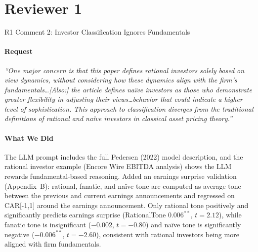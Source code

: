 \documentclass[11pt]{article}
\makeatletter
\def\section{\@ifstar\section@star\section@nostar}
\def\section@star#1{%
  \par\vspace{1.5ex}%
  \noindent{\normalsize\bfseries#1}\par%
  \vspace{0.5ex}%
  \@afterheading%
}
\def\section@nostar#1{%
  \par\vspace{1.5ex}%
  \noindent{%
    \setlength{\fboxsep}{4pt}%
    \colorbox{sectionbg}{\parbox{\dimexpr\textwidth-8pt\relax}{\normalsize\bfseries\strut#1\strut}}%
  }\par%
  \vspace{0.5ex}%
  \@afterheading%
}
\makeatother
\begin{document}
\newpage
\part{Reviewer 1}

\section{R1 Comment 2: Investor Classification Ignores Fundamentals}

\subsection*{Request}
\begin{mdframed}
\textit{``One major concern is that this paper defines rational investors
solely based on view dynamics, without considering how these dynamics align
with the firm's fundamentals\ldots [Also:] the article defines na\"{i}ve
investors as those who demonstrate greater flexibility in adjusting their
views\ldots behavior that could indicate a higher level of sophistication.
This approach to classification diverges from the traditional definitions of
rational and na\"{i}ve investors in classical asset pricing theory.''}
\end{mdframed}

\subsection*{What We Did}
The LLM prompt includes the full Pedersen (2022) model description, and the
rational investor example (Encore Wire EBITDA analysis) shows the LLM rewards
fundamental-based reasoning. Added an earnings surprise validation (Appendix~B): rational, fanatic, and
na\"{i}ve tone are computed as average tone between the previous and current
earnings announcements and regressed on CAR[-1,1] around the earnings
announcement. Only rational tone positively and significantly predicts
earnings surprise (RationalTone $0.006^{**}$, $t=2.12$), while fanatic tone
is insignificant ($-0.002$, $t=-0.80$) and na\"{i}ve tone is significantly
negative ($-0.006^{**}$, $t=-2.60$), consistent with rational investors being
more aligned with firm fundamentals.
\end{document}
